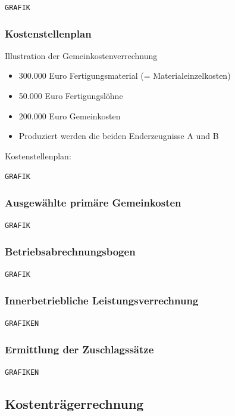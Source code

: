 \documentclass[a4paper,11pt, twoside]{article}
\begin{document}
\texttt{GRAFIK}

\subsubsection*{Kostenstellenplan}

Illustration der Gemeinkostenverrechnung
\begin{itemize}
	\item 300.000 Euro Fertigungsmaterial (= Materialeinzelkosten)
	\item 50.000 Euro Fertigungslöhne
	\item 200.000 Euro Gemeinkosten
	\item Produziert werden die beiden Enderzeugnisse A und B
\end{itemize} 

Kostenstellenplan:


\texttt{GRAFIK}


\subsubsection*{Ausgewählte primäre Gemeinkosten}

\texttt{GRAFIK}

\subsubsection*{Betriebsabrechnungsbogen}

\texttt{GRAFIK}

\subsubsection*{Innerbetriebliche Leistungsverrechnung}

\texttt{GRAFIKEN}

\subsubsection*{Ermittlung der Zuschlagssätze}

\texttt{GRAFIKEN}

\subsection{Kostenträgerrechnung}
\end{document}
